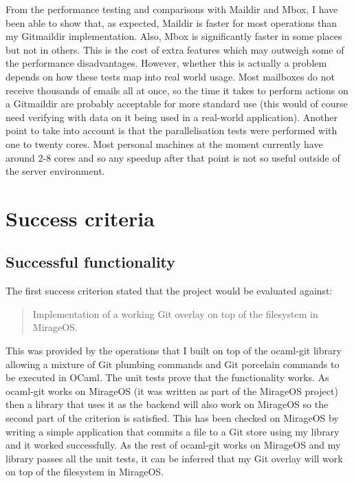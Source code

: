 From the performance testing and comparisons with Maildir and Mbox, I have been able to show that, as expected, Maildir is faster for most operations than my Gitmaildir implementation. Also, Mbox is significantly faster in some places but not in others. This is the cost of extra features which may outweigh some of the performance disadvantages. However, whether this is actually a problem depends on how these tests map into real world usage. Most mailboxes do not receive thousands of emails all at once, so the time it takes to perform actions on a Gitmaildir are probably acceptable for more standard use (this would of course need verifying with data on it being used in a real-world application). Another point to take into account is that the parallelisation tests were performed with one to twenty cores. Most personal machines at the moment currently have around 2-8 cores and so any speedup after that point is not so useful outside of the server environment.

\section{Success criteria}

\subsection{Successful functionality}

The first success criterion stated that the project would be evaluated against:

\begin{quote}
  Implementation of a working Git overlay on top of the filesystem in MirageOS.
\end{quote}

This was provided by the operations that I built on top of the ocaml-git library allowing a mixture of Git plumbing commands and Git porcelain commands to be executed in OCaml. The unit tests prove that the functionality works. As ocaml-git works on MirageOS (it was written as part of the MirageOS project) then a library that uses it as the backend will also work on MirageOS so the second part of the criterion is satisfied. This has been checked on MirageOS by writing a simple application that commits a file to a Git store using my library and it worked successfully. As the rest of ocaml-git works on MirageOS and my library passes all the unit tests, it can be inferred that my Git overlay will work on top of the filesystem in MirageOS.


